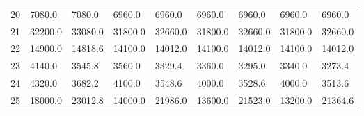 \begin{tabular}{|r|l|l|l|l|l|l|l|l|}
  20 & 7080.0 & 7080.0 & 6960.0 & 6960.0 & 6960.0 & 6960.0 & 6960.0 & 6960.0 \\ 
  21 & 32200.0 & 33080.0 & 31800.0 & 32660.0 & 31800.0 & 32660.0 & 31800.0 & 32660.0 \\ 
  22 & 14900.0 & 14818.6 & 14100.0 & 14012.0 & 14100.0 & 14012.0 & 14100.0 & 14012.0 \\ 
  23 & 4140.0 & 3545.8 & 3560.0 & 3329.4 & 3360.0 & 3295.0 & 3340.0 & 3273.4 \\ 
  24 & 4320.0 & 3682.2 & 4100.0 & 3548.6 & 4000.0 & 3528.6 & 4000.0 & 3513.6 \\ 
  25 & 18000.0 & 23012.8 & 14000.0 & 21986.0 & 13600.0 & 21523.0 & 13200.0 & 21364.6 \\ 
\end{tabular}

